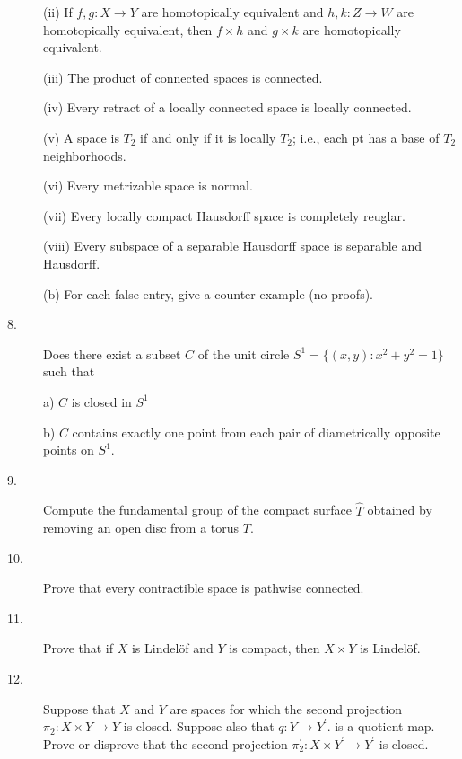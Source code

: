 \documentclass{article}
\begin{document}
\begin{description}
\item[\qquad] (ii)
If $f,g : X \to Y$ are homotopically equivalent and $h,k: Z \to W$ are
homotopically equivalent, then $f \times h$ and $g \times k$ are
homotopically equivalent.

\item[\qquad] (iii)
The product of connected spaces is connected.

\item[\qquad] (iv)
Every retract of a locally connected space is locally connected.

\item[\qquad] (v)
A space is $T_2$ if and only if it is locally $T_2$; i.e., each pt has a
base of $T_2$ neighborhoods.

\item[\qquad] (vi)
Every metrizable space is normal.

\item[\qquad] (vii)
Every locally compact Hausdorff space is completely reuglar.

\item[\qquad] (viii)
Every subspace of a separable Hausdorff space is separable and Hausdorff.

\item[\quad] (b)
For each false entry, give a counter example (no proofs).

\item[8.]
Does there exist a subset $C$ of the unit circle
$S^1 = \{(x,y) : x^2 + y^2 = 1\}$ such that

\item[\quad] a)
$C$ is closed in $S^1$

\item[\quad] b)
$C$ contains exactly one point from each pair of diametrically opposite
points on $S^1$.

\item[9.]
Compute the fundamental group of the compact surface $\hat T$ obtained by
removing an open disc from a torus $T$.

\item[10.]
Prove that every contractible space is pathwise connected.

\item[11.]
Prove that if $X$ is Lindel\"of and $Y$ is compact, then $X \times Y$ is
Lindel\"of.

\item[12.]
Suppose that $X$ and $Y$ are spaces for which the second projection
$\pi_2 : X \times Y \to Y$ is closed. Suppose also that $q: Y \to Y^\prime$.
is a quotient map. Prove or disprove that the second projection
$\pi^\prime_2 : X \times Y^\prime \to Y^\prime$ is closed.


\end{description}
\end{document}
